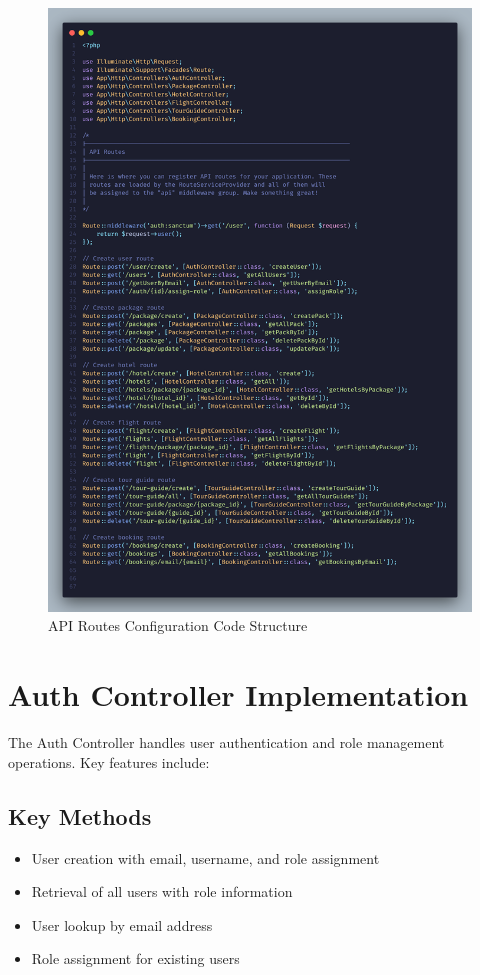 \begin{figure}[H]
  \centering
  \includegraphics[width=1.0\textwidth]{./figures/implementation/api.png}
  \caption{API Routes Configuration Code Structure}
  \label{fig:api_routes}
\end{figure}

\section{Auth Controller Implementation}

The Auth Controller handles user authentication and role management operations. Key features include:

\subsection{Key Methods}
\begin{itemize}
    \item User creation with email, username, and role assignment
    \item Retrieval of all users with role information
    \item User lookup by email address
    \item Role assignment for existing users
\end{itemize}

